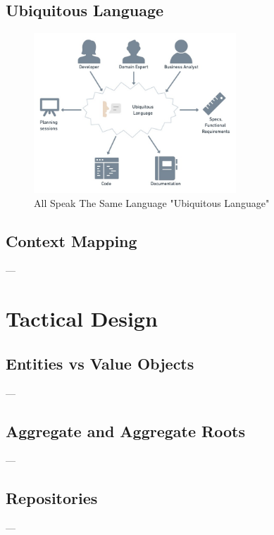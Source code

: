 \documentclass{beamer}
\begin{document}
	\subsection {Ubiquitous Language}		
		\begin{frame}
			\begin{figure}[h]
				\includegraphics[width=0.8\linewidth , height=60mm]{img/ubiquitous-language.png}
				\caption{All Speak The Same Language "Ubiquitous Language"}
			\end{figure}
		\end{frame}
	
	\subsection {Context Mapping}
		\begin{frame}
		---
		\end{frame}
		
\section{Tactical Design}
	\subsection {Entities vs Value Objects}
		\begin{frame}
		---
		\end{frame}

	\subsection {Aggregate and Aggregate Roots}
		\begin{frame}
		---
		\end{frame}

	\subsection {Repositories}
		\begin{frame}
		---
		\end{frame}
\end{document}

